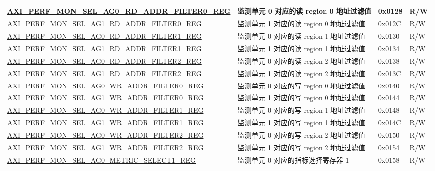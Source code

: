 \begin{longtable}{ | p{9.1cm} | p{5cm} | p{1.3cm} | p{1.3cm} | }
\hyperref[regdesc:AXIPERFMONSELAGNRDADDRFILTERMREG]{AXI\_PERF\_MON\_SEL\_AG0\_RD\_ADDR\_FILTER0\_REG} & 监测单元 0 对应的读 region 0 地址过滤值 & 0x0128 & R/W\\ \hline
\hyperref[regdesc:AXIPERFMONSELAGNRDADDRFILTERMREG]{AXI\_PERF\_MON\_SEL\_AG1\_RD\_ADDR\_FILTER0\_REG} & 监测单元 1 对应的读 region 0 地址过滤值 & 0x012C & R/W\\ \hline
\hyperref[regdesc:AXIPERFMONSELAGNRDADDRFILTERMREG]{AXI\_PERF\_MON\_SEL\_AG0\_RD\_ADDR\_FILTER1\_REG} & 监测单元 0 对应的读 region 1 地址过滤值 & 0x0130 & R/W\\ \hline
\hyperref[regdesc:AXIPERFMONSELAGNRDADDRFILTERMREG]{AXI\_PERF\_MON\_SEL\_AG1\_RD\_ADDR\_FILTER1\_REG} & 监测单元 1 对应的读 region 1 地址过滤值 & 0x0134 & R/W\\ \hline
\hyperref[regdesc:AXIPERFMONSELAGNRDADDRFILTERMREG]{AXI\_PERF\_MON\_SEL\_AG0\_RD\_ADDR\_FILTER2\_REG} & 监测单元 0 对应的读 region 2 地址过滤值 & 0x0138 & R/W\\ \hline
\hyperref[regdesc:AXIPERFMONSELAGNRDADDRFILTERMREG]{AXI\_PERF\_MON\_SEL\_AG1\_RD\_ADDR\_FILTER2\_REG} & 监测单元 1 对应的读 region 2 地址过滤值 & 0x013C & R/W\\ \hline
\hyperref[regdesc:AXIPERFMONSELAGNWRADDRFILTERMREG]{AXI\_PERF\_MON\_SEL\_AG0\_WR\_ADDR\_FILTER0\_REG} & 监测单元 0 对应的写 region 0 地址过滤值 & 0x0140 & R/W\\ \hline
\hyperref[regdesc:AXIPERFMONSELAGNWRADDRFILTERMREG]{AXI\_PERF\_MON\_SEL\_AG1\_WR\_ADDR\_FILTER0\_REG} & 监测单元 1 对应的写 region 0 地址过滤值 & 0x0144 & R/W\\ \hline
\hyperref[regdesc:AXIPERFMONSELAGNWRADDRFILTERMREG]{AXI\_PERF\_MON\_SEL\_AG0\_WR\_ADDR\_FILTER1\_REG} & 监测单元 0 对应的写 region 1 地址过滤值 & 0x0148 & R/W\\ \hline
\hyperref[regdesc:AXIPERFMONSELAGNWRADDRFILTERMREG]{AXI\_PERF\_MON\_SEL\_AG1\_WR\_ADDR\_FILTER1\_REG} & 监测单元 1 对应的写 region 1 地址过滤值 & 0x014C & R/W\\ \hline
\hyperref[regdesc:AXIPERFMONSELAGNWRADDRFILTERMREG]{AXI\_PERF\_MON\_SEL\_AG0\_WR\_ADDR\_FILTER2\_REG} & 监测单元 0 对应的写 region 2 地址过滤值 & 0x0150 & R/W\\ \hline
\hyperref[regdesc:AXIPERFMONSELAGNWRADDRFILTERMREG]{AXI\_PERF\_MON\_SEL\_AG1\_WR\_ADDR\_FILTER2\_REG} & 监测单元 1 对应的写 region 2 地址过滤值 & 0x0154 & R/W\\ \hline
\hyperref[regdesc:AXIPERFMONSELAGNMETRICSELECTMREG]{AXI\_PERF\_MON\_SEL\_AG0\_METRIC\_SELECT1\_REG} & 监测单元 0 对应的指标选择寄存器 1 & 0x0158 & R/W\\ \hline

\end{longtable}
